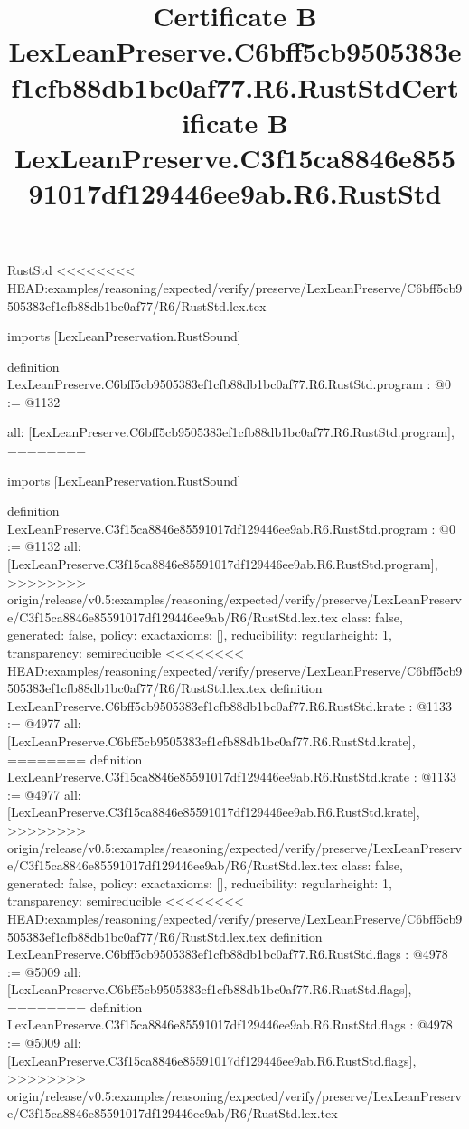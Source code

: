 \begin{lexlean}{RustStd}
<<<<<<<< HEAD:examples/reasoning/expected/verify/preserve/LexLeanPreserve/C6bff5cb9505383ef1cfb88db1bc0af77/R6/RustStd.lex.tex
\title{Certificate B LexLeanPreserve.C6bff5cb9505383ef1cfb88db1bc0af77.R6.RustStd}
\begin{coremodule}
imports [LexLeanPreservation.RustSound]

definition LexLeanPreserve.C6bff5cb9505383ef1cfb88db1bc0af77.R6.RustStd.program : @0 := @1132 {
  all: [LexLeanPreserve.C6bff5cb9505383ef1cfb88db1bc0af77.R6.RustStd.program],
========
\title{Certificate B LexLeanPreserve.C3f15ca8846e85591017df129446ee9ab.R6.RustStd}
\begin{coremodule}
imports [LexLeanPreservation.RustSound]

definition LexLeanPreserve.C3f15ca8846e85591017df129446ee9ab.R6.RustStd.program : @0 := @1132 {
  all: [LexLeanPreserve.C3f15ca8846e85591017df129446ee9ab.R6.RustStd.program],
>>>>>>>> origin/release/v0.5:examples/reasoning/expected/verify/preserve/LexLeanPreserve/C3f15ca8846e85591017df129446ee9ab/R6/RustStd.lex.tex
  class: false,
  generated: false,
  policy: exact{axioms: []},
  reducibility: regular{height: 1},
  transparency: semireducible
}
<<<<<<<< HEAD:examples/reasoning/expected/verify/preserve/LexLeanPreserve/C6bff5cb9505383ef1cfb88db1bc0af77/R6/RustStd.lex.tex
definition LexLeanPreserve.C6bff5cb9505383ef1cfb88db1bc0af77.R6.RustStd.krate : @1133 := @4977 {
  all: [LexLeanPreserve.C6bff5cb9505383ef1cfb88db1bc0af77.R6.RustStd.krate],
========
definition LexLeanPreserve.C3f15ca8846e85591017df129446ee9ab.R6.RustStd.krate : @1133 := @4977 {
  all: [LexLeanPreserve.C3f15ca8846e85591017df129446ee9ab.R6.RustStd.krate],
>>>>>>>> origin/release/v0.5:examples/reasoning/expected/verify/preserve/LexLeanPreserve/C3f15ca8846e85591017df129446ee9ab/R6/RustStd.lex.tex
  class: false,
  generated: false,
  policy: exact{axioms: []},
  reducibility: regular{height: 1},
  transparency: semireducible
}
<<<<<<<< HEAD:examples/reasoning/expected/verify/preserve/LexLeanPreserve/C6bff5cb9505383ef1cfb88db1bc0af77/R6/RustStd.lex.tex
definition LexLeanPreserve.C6bff5cb9505383ef1cfb88db1bc0af77.R6.RustStd.flags : @4978 := @5009 {
  all: [LexLeanPreserve.C6bff5cb9505383ef1cfb88db1bc0af77.R6.RustStd.flags],
========
definition LexLeanPreserve.C3f15ca8846e85591017df129446ee9ab.R6.RustStd.flags : @4978 := @5009 {
  all: [LexLeanPreserve.C3f15ca8846e85591017df129446ee9ab.R6.RustStd.flags],
>>>>>>>> origin/release/v0.5:examples/reasoning/expected/verify/preserve/LexLeanPreserve/C3f15ca8846e85591017df129446ee9ab/R6/RustStd.lex.tex
}}}
\end{coremodule}}
\end{coremodule}
\end{lexlean}
